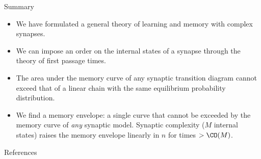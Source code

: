 \documentclass[final,hyperref={pdfpagelabels=false,bookmarks=false}]{beamer}
\begin{document}
\begin{frame}{}
\begin{columns}[t]
\begin{column}{0.32\linewidth}
%
%



\begin{block}{Summary}
%
  \begin{itemize}
    \item We have formulated a general theory of learning and memory with complex synapses.
    \item We can impose an order on the internal states of a synapse through the theory of first passage times.
    \item The area under the memory curve of any synaptic transition diagram cannot exceed that of a linear chain with the same equilibrium probability distribution.
    \item We find a memory envelope: a single curve that cannot be exceeded by the memory curve of \emph{any} synaptic model.
        Synaptic complexity ($M$ internal states) raises the memory envelope linearly in $n$ for times $> \CO(M)$.
  \end{itemize}
%
\end{block}


\begin{block}{References}
%
 {\tiny
 
 
 }
%
\end{block}


\end{column}
\end{columns}
\end{frame}
\end{document}

